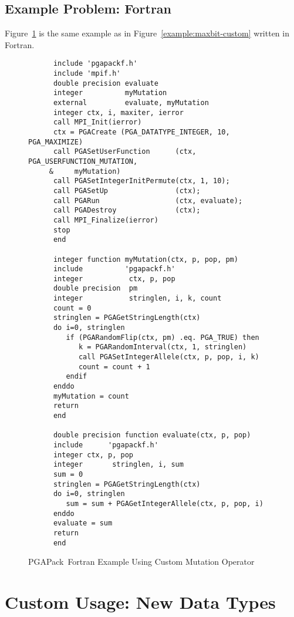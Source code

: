 \documentclass{report}
\newcommand{\pga}{PGAPack}
\begin{document}
\section{Example Problem: Fortran}

Figure~\ref{example:maxbit-custom-f77} is the same example as in 
Figure~\ref{example:maxbit-custom} written in Fortran.

\begin{figure}
\begin{verbatim}
      include 'pgapackf.h'
      include 'mpif.h'
      double precision evaluate
      integer          myMutation
      external         evaluate, myMutation
      integer ctx, i, maxiter, ierror
      call MPI_Init(ierror)
      ctx = PGACreate (PGA_DATATYPE_INTEGER, 10, PGA_MAXIMIZE)
      call PGASetUserFunction      (ctx, PGA_USERFUNCTION_MUTATION,
     &     myMutation)
      call PGASetIntegerInitPermute(ctx, 1, 10);
      call PGASetUp                (ctx);
      call PGARun                  (ctx, evaluate);
      call PGADestroy              (ctx);
      call MPI_Finalize(ierror)
      stop
      end
      
      integer function myMutation(ctx, p, pop, pm)
      include          'pgapackf.h'
      integer           ctx, p, pop
      double precision  pm
      integer           stringlen, i, k, count
      count = 0
      stringlen = PGAGetStringLength(ctx)
      do i=0, stringlen
         if (PGARandomFlip(ctx, pm) .eq. PGA_TRUE) then
            k = PGARandomInterval(ctx, 1, stringlen)
            call PGASetIntegerAllele(ctx, p, pop, i, k)
            count = count + 1
         endif
      enddo
      myMutation = count
      return
      end

      double precision function evaluate(ctx, p, pop)
      include      'pgapackf.h'
      integer ctx, p, pop
      integer       stringlen, i, sum
      sum = 0
      stringlen = PGAGetStringLength(ctx)
      do i=0, stringlen
         sum = sum + PGAGetIntegerAllele(ctx, p, pop, i)
      enddo
      evaluate = sum
      return
      end
\end{verbatim}
\caption{\pga\ Fortran Example Using Custom Mutation Operator}
\label{example:maxbit-custom-f77}
\end{figure}

\chapter{Custom Usage: New Data Types}\label{chp:new-data}
\end{document}
